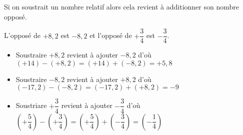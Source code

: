 \begin{propriete}
    Si on soustrait un nombre relatif alors cela revient à additionner son nombre opposé.
\end{propriete}

\begin{exemple*1}
    L'opposé de $+8,2$ est $-8,2$ et l'opposé de $+\dfrac34$ est $-\dfrac34$.
    \begin{itemize}
        \item Soustraire $+8,2$ revient à ajouter $-8,2$ d'où $(+14)-(+8,2)=(+14)+(-8,2)=+5,8$
        \item Soustraire $-8,2$ revient à ajouter $+8,2$ d'où $(-17,2)-(-8,2)=(-17,2)+(+8,2)=-9$
        \item Soustriare $+\dfrac34$ revient à ajouter $-\dfrac34$ d'où $\left(+\dfrac54\right) -\left(+\dfrac34\right)=\left(+\dfrac54\right) +\left(-\dfrac34\right)=\left(-\dfrac14\right)$
    \end{itemize}
\end{exemple*1}



